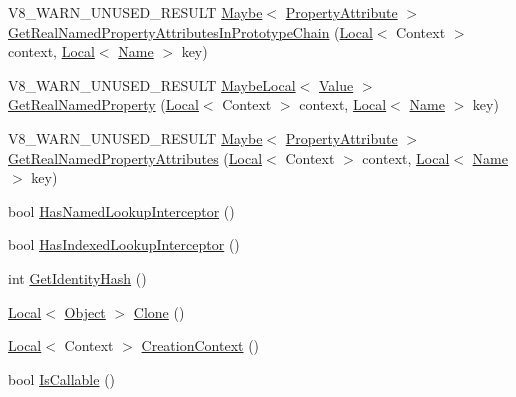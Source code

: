 \begin{DoxyCompactItemize}
\item 
V8\+\_\+\+W\+A\+R\+N\+\_\+\+U\+N\+U\+S\+E\+D\+\_\+\+R\+E\+S\+U\+LT \mbox{\hyperlink{classv8_1_1Maybe}{Maybe}}$<$ \mbox{\hyperlink{namespacev8_a05f25f935e108a1ea2d150e274602b87}{Property\+Attribute}} $>$ \mbox{\hyperlink{classv8_1_1Object_aab7c2e5c5659e95e97488e01b04bf3c8}{Get\+Real\+Named\+Property\+Attributes\+In\+Prototype\+Chain}} (\mbox{\hyperlink{classv8_1_1Local}{Local}}$<$ Context $>$ context, \mbox{\hyperlink{classv8_1_1Local}{Local}}$<$ \mbox{\hyperlink{classv8_1_1Name}{Name}} $>$ key)
\item 
V8\+\_\+\+W\+A\+R\+N\+\_\+\+U\+N\+U\+S\+E\+D\+\_\+\+R\+E\+S\+U\+LT \mbox{\hyperlink{classv8_1_1MaybeLocal}{Maybe\+Local}}$<$ \mbox{\hyperlink{classv8_1_1Value}{Value}} $>$ \mbox{\hyperlink{classv8_1_1Object_aecec39cefb3e394e1696fe618862efec}{Get\+Real\+Named\+Property}} (\mbox{\hyperlink{classv8_1_1Local}{Local}}$<$ Context $>$ context, \mbox{\hyperlink{classv8_1_1Local}{Local}}$<$ \mbox{\hyperlink{classv8_1_1Name}{Name}} $>$ key)
\item 
V8\+\_\+\+W\+A\+R\+N\+\_\+\+U\+N\+U\+S\+E\+D\+\_\+\+R\+E\+S\+U\+LT \mbox{\hyperlink{classv8_1_1Maybe}{Maybe}}$<$ \mbox{\hyperlink{namespacev8_a05f25f935e108a1ea2d150e274602b87}{Property\+Attribute}} $>$ \mbox{\hyperlink{classv8_1_1Object_a476c21f05ffc519252fad0ab46de33d7}{Get\+Real\+Named\+Property\+Attributes}} (\mbox{\hyperlink{classv8_1_1Local}{Local}}$<$ Context $>$ context, \mbox{\hyperlink{classv8_1_1Local}{Local}}$<$ \mbox{\hyperlink{classv8_1_1Name}{Name}} $>$ key)
\item 
bool \mbox{\hyperlink{classv8_1_1Object_a1e96fcb9ee17101c0299ec68f2cf8610}{Has\+Named\+Lookup\+Interceptor}} ()
\item 
bool \mbox{\hyperlink{classv8_1_1Object_a278913bcd203434870ce5184a538a9af}{Has\+Indexed\+Lookup\+Interceptor}} ()
\item 
int \mbox{\hyperlink{classv8_1_1Object_ac1ece41e81a499920ec3a2a3471653bc}{Get\+Identity\+Hash}} ()
\item 
\mbox{\hyperlink{classv8_1_1Local}{Local}}$<$ \mbox{\hyperlink{classv8_1_1Object}{Object}} $>$ \mbox{\hyperlink{classv8_1_1Object_a5018c9d085aa71f65530cf1e073a04ad}{Clone}} ()
\item 
\mbox{\hyperlink{classv8_1_1Local}{Local}}$<$ Context $>$ \mbox{\hyperlink{classv8_1_1Object_af6966283a7d7e20779961eed434db04d}{Creation\+Context}} ()
\item 
bool \mbox{\hyperlink{classv8_1_1Object_a23c2c1f23b50fab4a02e2f819641b865}{Is\+Callable}} ()
\item 

\end{DoxyCompactItemize}
